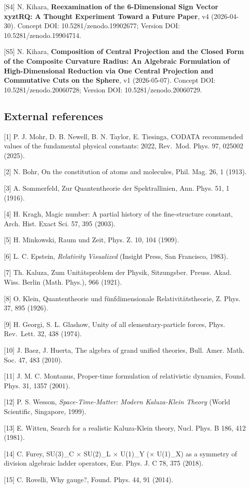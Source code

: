 \documentclass[
  a4paper,
]{article}
\begin{document}
{[}S4{]} N. Kihara, \textbf{Reexamination of the 6-Dimensional Sign
Vector xyztRQ: A Thought Experiment Toward a Future Paper}, v4
(2026-04-30). Concept DOI: 10.5281/zenodo.19902677; Version DOI:
10.5281/zenodo.19904714.

{[}S5{]} N. Kihara, \textbf{Composition of Central Projection and the
Closed Form of the Composite Curvature Radius: An Algebraic Formulation
of High-Dimensional Reduction via One Central Projection and Commutative
Cuts on the Sphere}, v1 (2026-05-07). Concept DOI:
10.5281/zenodo.20060728; Version DOI: 10.5281/zenodo.20060729.

\subsection{External references}\label{external-references}

{[}1{]} P. J. Mohr, D. B. Newell, B. N. Taylor, E. Tiesinga, CODATA
recommended values of the fundamental physical constants: 2022,
Rev.~Mod. Phys. 97, 025002 (2025).

{[}2{]} N. Bohr, On the constitution of atoms and molecules, Phil. Mag.
26, 1 (1913).

{[}3{]} A. Sommerfeld, Zur Quantentheorie der Spektrallinien, Ann. Phys.
51, 1 (1916).

{[}4{]} H. Kragh, Magic number: A partial history of the fine-structure
constant, Arch. Hist. Exact Sci. 57, 395 (2003).

{[}5{]} H. Minkowski, Raum und Zeit, Phys. Z. 10, 104 (1909).

{[}6{]} L. C. Epstein, \emph{Relativity Visualized} (Insight Press, San
Francisco, 1983).

{[}7{]} Th. Kaluza, Zum Unitätsproblem der Physik, Sitzungsber. Preuss.
Akad. Wiss. Berlin (Math. Phys.), 966 (1921).

{[}8{]} O. Klein, Quantentheorie und fünfdimensionale
Relativitätstheorie, Z. Phys. 37, 895 (1926).

{[}9{]} H. Georgi, S. L. Glashow, Unity of all elementary-particle
forces, Phys. Rev.~Lett. 32, 438 (1974).

{[}10{]} J. Baez, J. Huerta, The algebra of grand unified theories,
Bull. Amer. Math. Soc. 47, 483 (2010).

{[}11{]} J. M. C. Montanus, Proper-time formulation of relativistic
dynamics, Found. Phys. 31, 1357 (2001).

{[}12{]} P. S. Wesson, \emph{Space-Time-Matter: Modern Kaluza-Klein
Theory} (World Scientific, Singapore, 1999).

{[}13{]} E. Witten, Search for a realistic Kaluza-Klein theory, Nucl.
Phys. B 186, 412 (1981).

{[}14{]} C. Furey, SU(3)\_C × SU(2)\_L × U(1)\_Y (× U(1)\_X) as a
symmetry of division algebraic ladder operators, Eur. Phys. J. C 78, 375
(2018).

{[}15{]} C. Rovelli, Why gauge?, Found. Phys. 44, 91 (2014).
\end{document}
